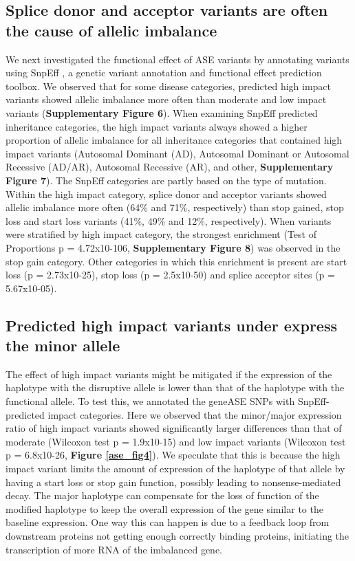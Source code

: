 \subsection{Splice donor and acceptor variants are often the cause of allelic imbalance}
We next investigated the functional effect of ASE variants by annotating variants using SnpEff \cite{cingolaniProgramAnnotatingPredicting2012}, a genetic variant annotation and functional effect prediction toolbox. We observed that for some disease categories, predicted high impact variants showed allelic imbalance more often than moderate and low impact variants (\textbf{Supplementary Figure 6}). When examining SnpEff predicted inheritance categories, the high impact variants always showed a higher proportion of allelic imbalance for all inheritance categories that contained high impact variants (Autosomal Dominant (AD), Autosomal Dominant or Autosomal Recessive (AD/AR), Autosomal Recessive (AR), and other, \textbf{Supplementary Figure 7}). The SnpEff categories are partly based on the type of mutation. Within the high impact category, splice donor and acceptor variants showed allelic imbalance more often (64\% and 71\%, respectively) than stop gained, stop loss and start loss variants (41\%, 49\% and 12\%, respectively). When variants were stratified by high impact category, the strongest enrichment (Test of Proportions p = 4.72x10-106, \textbf{Supplementary Figure 8}) was observed in the stop gain category. Other categories in which this enrichment is present are start loss (p = 2.73x10-25), stop loss (p = 2.5x10-50) and splice acceptor sites (p = 5.67x10-05).


\subsection{Predicted high impact variants under express the minor allele}
The effect of high impact variants might be mitigated if the expression of the haplotype with the disruptive allele is lower than that of the haplotype with the functional allele. To test this, we annotated the geneASE SNPs with SnpEff-predicted impact categories. Here we observed that the minor/major expression ratio of high impact variants showed significantly larger differences than that of moderate (Wilcoxon  test p = 1.9x10-15) and low impact variants (Wilcoxon test p = 6.8x10-26, \textbf{Figure \ref{ase_fig4}}). We speculate that this is because the high impact variant limits the amount of expression of the haplotype of that allele by having a start loss or stop gain function, possibly leading to nonsense-mediated decay. The major haplotype can compensate for the loss of function of the modified haplotype to keep the overall expression of the gene similar to the baseline expression. One way this can happen is due to a feedback loop from downstream proteins not getting enough correctly binding proteins, initiating the transcription of more RNA of the imbalanced gene. 

